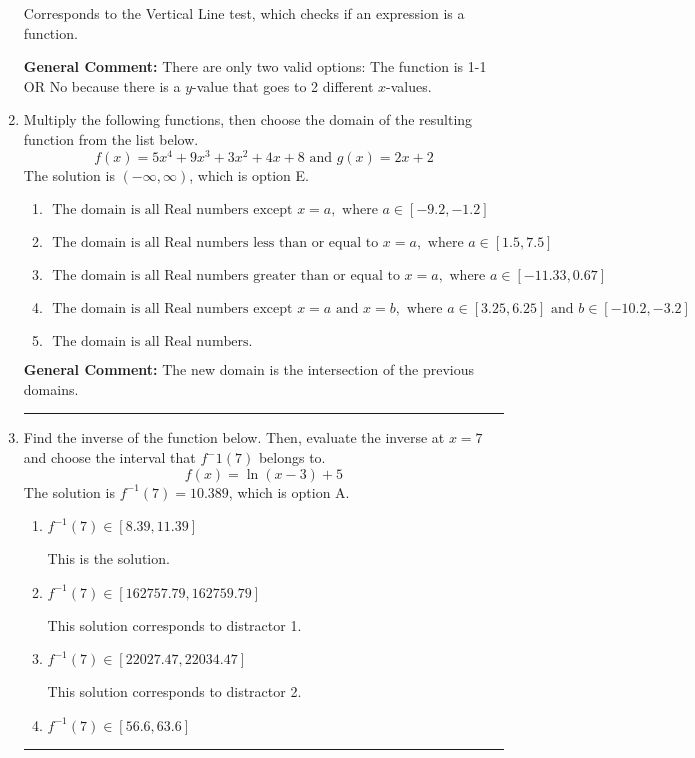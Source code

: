 \documentclass{extbook}[14pt]
\newcommand{\litem}[1]{\item #1

\rule{\textwidth}{0.4pt}}
\begin{document}
\begin{enumerate}
{\begin{enumerate}[label=\Alph*.]
Corresponds to the Vertical Line test, which checks if an expression is a function.
\end{enumerate}

\textbf{General Comment:} There are only two valid options: The function is 1-1 OR No because there is a $y$-value that goes to 2 different $x$-values.
}
\litem{
Multiply the following functions, then choose the domain of the resulting function from the list below.
\[ f(x) = 5x^{4} +9 x^{3} +3 x^{2} +4 x + 8 \text{ and } g(x) = 2x + 2 \]The solution is \( (-\infty, \infty) \), which is option E.\begin{enumerate}[label=\Alph*.]
\item \( \text{ The domain is all Real numbers except } x = a, \text{ where } a \in [-9.2, -1.2] \)


\item \( \text{ The domain is all Real numbers less than or equal to } x = a, \text{ where } a \in [1.5, 7.5] \)


\item \( \text{ The domain is all Real numbers greater than or equal to } x = a, \text{ where } a \in [-11.33, 0.67] \)


\item \( \text{ The domain is all Real numbers except } x = a \text{ and } x = b, \text{ where } a \in [3.25, 6.25] \text{ and } b \in [-10.2, -3.2] \)


\item \( \text{ The domain is all Real numbers. } \)


\end{enumerate}

\textbf{General Comment:} The new domain is the intersection of the previous domains.
}
\litem{
Find the inverse of the function below. Then, evaluate the inverse at $x = 7$ and choose the interval that $f^-1(7)$ belongs to.
\[ f(x) = \ln{(x-3)}+5 \]The solution is \( f^{-1}(7) = 10.389 \), which is option A.\begin{enumerate}[label=\Alph*.]
\item \( f^{-1}(7) \in [8.39, 11.39] \)

 This is the solution.
\item \( f^{-1}(7) \in [162757.79, 162759.79] \)

 This solution corresponds to distractor 1.
\item \( f^{-1}(7) \in [22027.47, 22034.47] \)

 This solution corresponds to distractor 2.
\item \( f^{-1}(7) \in [56.6, 63.6] \)


\end{enumerate}}
\end{enumerate}
\end{document}
